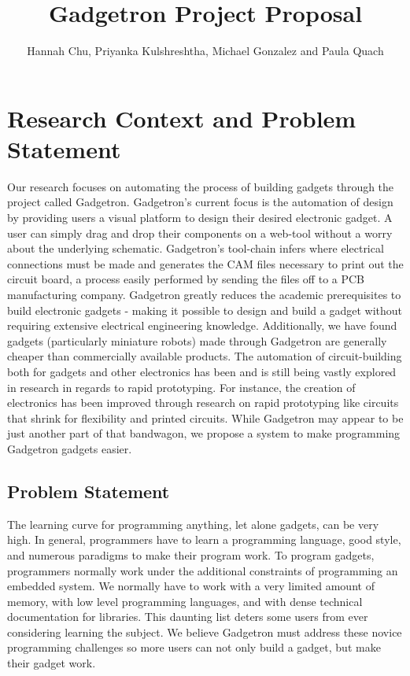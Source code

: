\documentclass[12pt]{article}
\begin{document}
\author{Hannah Chu, Priyanka Kulshreshtha, Michael Gonzalez and Paula Quach}
\title{Gadgetron Project Proposal}
\maketitle

\section{Research Context and Problem Statement}
Our research focuses on automating the process of building gadgets through the project called Gadgetron. Gadgetron's current focus is the automation of design by providing users a visual platform to design their desired electronic gadget. A user can simply drag and drop their components on a web-tool without a worry about the underlying schematic. Gadgetron's tool-chain infers where electrical connections must be made and generates the CAM files necessary to print out the circuit board, a process easily performed by sending the files off to a PCB manufacturing company. Gadgetron greatly reduces the academic prerequisites to build electronic gadgets - making it possible to design and build a gadget without requiring extensive electrical engineering knowledge. Additionally, we have found gadgets (particularly miniature robots) made through Gadgetron are generally cheaper than commercially available products. The automation of circuit-building both for gadgets and other electronics has been and is still being vastly explored in research in regards to rapid prototyping. For instance, the creation of electronics has been improved through research on rapid prototyping like circuits that shrink for flexibility\cite{shrinky} and printed circuits\cite{inkjets}. While Gadgetron may appear to be just another part of that bandwagon, we propose a system to make programming Gadgetron gadgets easier.
\subsection{Problem Statement}
The learning curve for programming anything, let alone gadgets, can be very high. In general, programmers have to learn a programming language, good style, and numerous paradigms to make their program work. To program gadgets, programmers normally work under the additional constraints of programming an embedded system. We normally have to work with a very limited amount of memory, with low level programming languages, and with dense technical documentation for libraries. This daunting list deters some users from ever considering learning the subject. We believe Gadgetron must address these novice programming challenges so more users can not only build a gadget, but make their gadget work. \\
\end{document}
